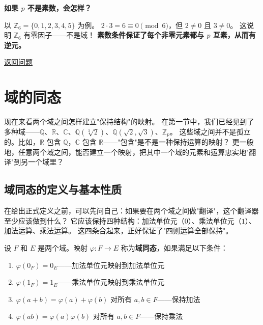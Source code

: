 \begin{exercise}\label{ex:ans-p-not-prime}
\hypertarget{ans:p-not-prime}{}
\textbf{如果 $p$ 不是素数，会怎样？}

以 $\mathbb{Z}_6 = \{0,1,2,3,4,5\}$ 为例。
$2 \cdot 3 = 6 \equiv 0 \pmod{6}$，但 $2 \neq 0$ 且 $3 \neq 0$。
这说明 $\mathbb{Z}_6$ 有零因子——不是域！
\textbf{素数条件保证了每个非零元素都与 $p$ 互素，从而有逆元。}

\hyperlink{q:p-not-prime}{返回问题}
\end{exercise}

\section{域的同态}\label{sec:field-homomorphism}

现在来看两个域之间怎样建立"保持结构"的映射。
在第一节中，我们已经见到了多种域——$\mathbb{Q}$、$\mathbb{R}$、$\mathbb{C}$、$\mathbb{Q}(\sqrt[3]{2})$、$\mathbb{Q}(\sqrt{2},\sqrt{3})$、$\mathbb{Z}_p$。
这些域之间并不是孤立的。比如，$\mathbb{R}$ 包含 $\mathbb{Q}$，$\mathbb{C}$ 包含 $\mathbb{R}$——"包含"是不是一种保持运算的映射？
更一般地，任意两个域之间，能否建立一个映射，把其中一个域的元素和运算忠实地"翻译"到另一个域里？

\subsection{域同态的定义与基本性质}

在给出正式定义之前，可以先问自己：如果要在两个域之间做"翻译"，这个翻译器至少应该做到什么？
它应该保持四种结构：加法单位元（$0$）、乘法单位元（$1$）、加法运算、乘法运算。
这四条合起来，正好保证了"四则运算全部保持"。

\begin{definition}[域同态]\label{def:field-homomorphism}
设 $F$ 和 $E$ 是两个域。映射 $\varphi: F \to E$ 称为\textbf{域同态}，如果满足以下条件：
\begin{enumerate}
    \item $\varphi(0_F) = 0_E$——加法单位元映射到加法单位元
    \item $\varphi(1_F) = 1_E$——乘法单位元映射到乘法单位元
    \item $\varphi(a + b) = \varphi(a) + \varphi(b)$ 对所有 $a, b \in F$——保持加法
    \item $\varphi(ab) = \varphi(a)\varphi(b)$ 对所有 $a, b \in F$——保持乘法
\end{enumerate}
\end{definition}

